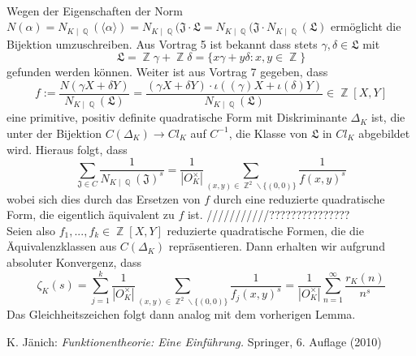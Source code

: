 \documentclass[10pt,a4paper]{article}
\DeclareMathOperator{\Q}{\mathbb{Q}}
\DeclareMathOperator{\Z}{\mathbb{Z}}
\begin{document}
\\
Wegen der Eigenschaften der Norm $N(\alpha)= N_{K\mid \Q}(\langle \alpha \rangle)=N_{K\mid \Q}(\mathfrak{J\cdot L}=N_{K\mid \Q}(\mathfrak{J}\cdot N_{K\mid \Q}(\mathfrak{L})$ ermöglicht die Bijektion umzuschreiben. Aus Vortrag 5 ist bekannt dass stets $\gamma, \delta \in \mathfrak{L}$ mit $$\mathfrak{L}= \Z\gamma+\Z\delta = \{x\gamma+y\delta\colon x,y \in \Z\}$$ gefunden werden können. Weiter ist aus Vortrag 7 gegeben, dass $$f:=\frac{N(\gamma X+\delta Y)}{N_{K\mid \Q}(\mathfrak{L})}=\frac{(\gamma X + \delta Y)\cdot \iota((\gamma)X+\iota(\delta)Y)}{N_{K\mid \Q}(\mathfrak{L})} \in \Z[X,Y]$$eine primitive, positiv definite quadratische Form mit Diskriminante $\Delta_K$ ist, die unter der Bijektion $C(\Delta_K)\rightarrow Cl_K$ auf $C^{-1}$, die Klasse von $\mathfrak{L}$ in $Cl_K$ abgebildet wird. Hieraus folgt, dass $$\sum_{\mathfrak{J}\in C}\frac{1}{N_{K\mid \Q }(\mathfrak{J})^s}=\frac{1}{|O_K^{\times}|}\sum_{(x,y)\in \Z^2\backslash \{ (0,0)\}}\frac{1}{f(x,y)^s}$$wobei sich dies durch das Ersetzen von $f$ durch eine reduzierte quadratische Form, die eigentlich äquivalent zu $f$ ist. ///////////???????????????
\\
Seien also $f_1,...,f_k \in \Z[X,Y]$ reduzierte quadratische Formen, die die Äquivalenzklassen aus $C(\Delta_K)$ repräsentieren. Dann erhalten wir aufgrund absoluter Konvergenz, dass $$\zeta_K(s) = \sum_{j=1}^{k}\frac{1}{|O_K^{\times}|}\sum_{(x,y) \in \Z^2 \backslash \{(0,0)\}}\frac{1}{f_j(x,y)^s}=\frac{1}{|O_K^{\times}|}\sum_{n=1}^{\infty}\frac{r_K(n)}{n^s}$$
Das Gleichheitszeichen folgt dann analog mit dem vorherigen Lemma.

 
\begin{thebibliography}{99}
 K. Jänich: \textit{Funktionentheorie: Eine Einführung.} Springer, 6. Auflage (2010)

\end{thebibliography}
\end{document}
